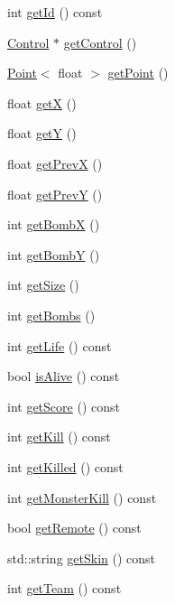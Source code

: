 \begin{DoxyCompactItemize}
\item 
int \hyperlink{class_player_afc6b4cc3a34e9b01f9f8659f5d9f62ec}{get\-Id} () const 
\item 
\hyperlink{class_control}{Control} $\ast$ \hyperlink{class_player_a177fc4573489be6bfced432d42dc9901}{get\-Control} ()
\item 
\hyperlink{class_point}{Point}$<$ float $>$ \hyperlink{class_player_ab0cd970c56e92afbb670ff92420cc620}{get\-Point} ()
\item 
float \hyperlink{class_player_a0a7dadbb84ba8e0d6688905cd1f33907}{get\-X} ()
\item 
float \hyperlink{class_player_a320d19fb4d116cb0bbe93ebd83401ee8}{get\-Y} ()
\item 
float \hyperlink{class_player_a19718078a93e54d5d642ada0a0e4720f}{get\-Prev\-X} ()
\item 
float \hyperlink{class_player_a033a3bfcecfba4fa915843e30b2f5ad8}{get\-Prev\-Y} ()
\item 
int \hyperlink{class_player_a3b1247033f5b70a95a18f8b3dc340ac4}{get\-Bomb\-X} ()
\item 
int \hyperlink{class_player_adf6b9c031c4f910356154868e5a1ce94}{get\-Bomb\-Y} ()
\item 
int \hyperlink{class_player_a5ac337bd1d470a1e2056ef5f733b4a05}{get\-Size} ()
\item 
int \hyperlink{class_player_ad033c753ad4551e741386f47efe8c5f5}{get\-Bombs} ()
\item 
int \hyperlink{class_player_a6869c0d8d0f77d6a25a5f511a3b127c7}{get\-Life} () const 
\item 
bool \hyperlink{class_player_a6bbe79e1857b945a3472beadccb32025}{is\-Alive} () const 
\item 
int \hyperlink{class_player_ac10eb9fb0387f565134958d129585ac6}{get\-Score} () const 
\item 
int \hyperlink{class_player_a37ce1500bd1bde0e6a38521b8a6ae5e3}{get\-Kill} () const 
\item 
int \hyperlink{class_player_a2249acef49eddb2aa28e52fb2b48d543}{get\-Killed} () const 
\item 
int \hyperlink{class_player_afd3d5494e20b82628ad16b6b9e076de5}{get\-Monster\-Kill} () const 
\item 
bool \hyperlink{class_player_a7db9e6e10fec7d36b2dab1268f405f68}{get\-Remote} () const 
\item 
std\-::string \hyperlink{class_player_aaa92b93cc17660bf094225dccc749583}{get\-Skin} () const 
\item 
int \hyperlink{class_player_ac8a09e2197142d048b0992ad770c08cd}{get\-Team} () const 

\end{DoxyCompactItemize}
